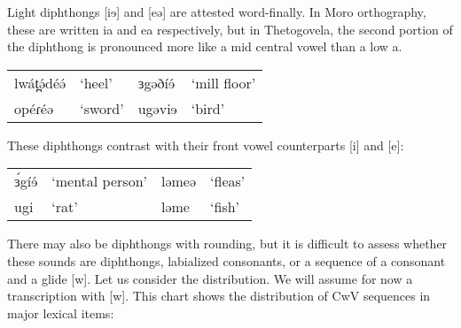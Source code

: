 Light diphthongs [iɘ] and [eə] are attested word-finally. In Moro orthography, these are written ia and ea respectively, but in Thetogovela, the second portion of the diphthong is pronounced more like a mid central vowel than a low a.

\ea	
\begin{tabular}[t]{llll}
lwát̪ə́déə́	&	‘heel’	&	ɜgəðíɘ́	&	‘mill floor’\\
opéɾéə	&	‘sword’	&	ugəviɘ	&	‘bird’
\end{tabular}\label{ex:ch2:6}
\z

These diphthongs contrast with their front vowel counterparts [i] and [e]:

\ea	
\begin{tabular}[t]{llll}
ɜ́gíɘ́	&	‘mental person’	&	ləmeə	&	‘fleas’\\
ugi		&	‘rat’			&	ləme	&	‘fish’
\end{tabular}\label{ex:ch2:7}
\z

There may also be diphthongs with rounding, but it is difficult to assess whether these sounds are diphthongs, labialized consonants, or a sequence of a consonant and a glide [w]. Let us consider the distribution. We will assume for now a transcription with [w]. This chart shows the distribution of CwV sequences in major lexical items:

